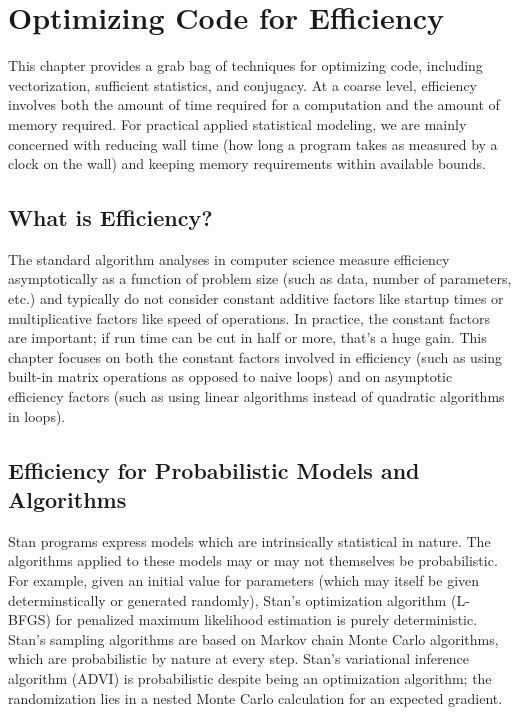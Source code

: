 \chapter{Optimizing \Stan Code for Efficiency}\label{optimization.chapter}
\noindent
This chapter provides a grab bag of techniques for optimizing \Stan
code, including vectorization, sufficient statistics, and conjugacy.
At a coarse level, efficiency involves both the amount of time
required for a computation and the amount of memory required.  For
practical applied statistical modeling, we are mainly concerned with
reducing wall time (how long a program takes as measured by a clock on
the wall) and keeping memory requirements within available bounds.

\section{What is Efficiency?}

The standard algorithm analyses in computer science measure efficiency
asymptotically as a function of problem size (such as data, number of
parameters, etc.) and typically do not consider constant additive
factors like startup times or multiplicative factors like speed of
operations.  In practice, the constant factors are important; if run
time can be cut in half or more, that's a huge gain. This chapter
focuses on both the constant factors involved in efficiency (such as
using built-in matrix operations as opposed to naive loops) and on
asymptotic efficiency factors (such as using linear algorithms instead
of quadratic algorithms in loops).


\section{Efficiency for Probabilistic Models and Algorithms}

Stan programs express models which are intrinsically statistical in
nature.  The algorithms applied to these models may or may not
themselves be probabilistic.  For example, given an initial value for
parameters (which may itself be given determinstically or generated
randomly), Stan's optimization algorithm (L-BFGS) for penalized
maximum likelihood estimation is purely deterministic.  Stan's
sampling algorithms are based on Markov chain Monte Carlo algorithms,
which are probabilistic by nature at every step.  Stan's variational
inference algorithm (ADVI) is probabilistic despite being an
optimization algorithm; the randomization lies in a nested Monte Carlo
calculation for an expected gradient.

